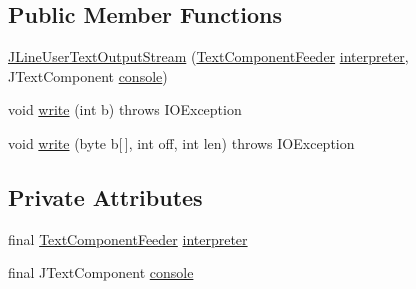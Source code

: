 \subsection*{Public Member Functions}
\begin{DoxyCompactItemize}
\item 
\hyperlink{classgov_1_1nasa_1_1jpf_1_1inspector_1_1frontends_1_1jpfshell_1_1gui_1_1_swing_terminal_1_1_j_line_user_text_output_stream_aced20bf9530ae1ae16e08eed27afaf48}{J\+Line\+User\+Text\+Output\+Stream} (\hyperlink{classgov_1_1nasa_1_1jpf_1_1inspector_1_1frontends_1_1jpfshell_1_1gui_1_1_text_component_feeder}{Text\+Component\+Feeder} \hyperlink{classgov_1_1nasa_1_1jpf_1_1inspector_1_1frontends_1_1jpfshell_1_1gui_1_1_swing_terminal_1_1_j_line_user_text_output_stream_a1134fdda4ea22ccfb10379627f32646b}{interpreter}, J\+Text\+Component \hyperlink{classgov_1_1nasa_1_1jpf_1_1inspector_1_1frontends_1_1jpfshell_1_1gui_1_1_swing_terminal_1_1_j_line_user_text_output_stream_ae5e3f90903e5f49e72dd7f24fe141922}{console})
\item 
void \hyperlink{classgov_1_1nasa_1_1jpf_1_1inspector_1_1frontends_1_1jpfshell_1_1gui_1_1_swing_terminal_1_1_j_line_user_text_output_stream_a9964c11c977c92d7d4b4e7927d792f38}{write} (int b)  throws I\+O\+Exception 
\item 
void \hyperlink{classgov_1_1nasa_1_1jpf_1_1inspector_1_1frontends_1_1jpfshell_1_1gui_1_1_swing_terminal_1_1_j_line_user_text_output_stream_a6d3210674403e20590d37fb1ed2643f0}{write} (byte b\mbox{[}$\,$\mbox{]}, int off, int len)  throws I\+O\+Exception 
\end{DoxyCompactItemize}
\subsection*{Private Attributes}
\begin{DoxyCompactItemize}
\item 
final \hyperlink{classgov_1_1nasa_1_1jpf_1_1inspector_1_1frontends_1_1jpfshell_1_1gui_1_1_text_component_feeder}{Text\+Component\+Feeder} \hyperlink{classgov_1_1nasa_1_1jpf_1_1inspector_1_1frontends_1_1jpfshell_1_1gui_1_1_swing_terminal_1_1_j_line_user_text_output_stream_a1134fdda4ea22ccfb10379627f32646b}{interpreter}
\item 
final J\+Text\+Component \hyperlink{classgov_1_1nasa_1_1jpf_1_1inspector_1_1frontends_1_1jpfshell_1_1gui_1_1_swing_terminal_1_1_j_line_user_text_output_stream_ae5e3f90903e5f49e72dd7f24fe141922}{console}
\end{DoxyCompactItemize}

